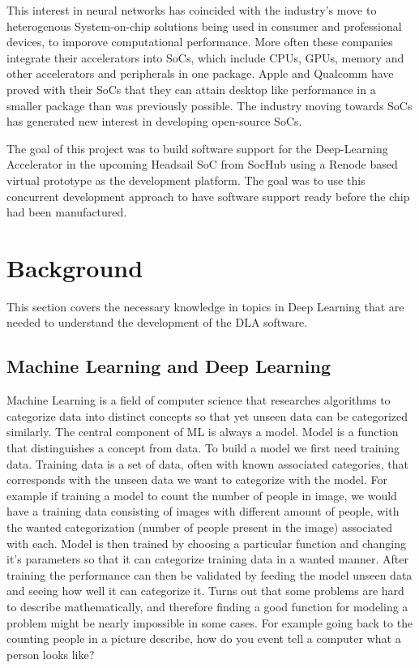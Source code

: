 \documentclass[12pt,a4paper,english
]{tunithesis}
\begin{document}
This interest in neural networks has coincided with the industry's move to heterogenous System-on-chip solutions being used in consumer and professional devices, to imporove computational performance.
More often these companies integrate their accelerators into SoCs, which include CPUs, GPUs, memory and other accelerators and peripherals in one package. Apple and Qualcomm have proved with their SoCs that they can attain desktop like performance in a smaller package than was previously possible. The industry moving towards SoCs has generated new interest in developing open-source SoCs.

The goal of this project was to build software support for the Deep-Learning Accelerator in the upcoming Headsail SoC from SocHub using a Renode based virtual prototype as the development platform. The goal was to use this concurrent development approach to have software support ready before the chip had been manufactured.

\chapter{Background}
This section covers the necessary knowledge in topics in Deep Learning that are needed to understand the development of the DLA software.
\label{ch:background}
\section{Machine Learning and Deep Learning}
Machine Learning is a field of computer science that researches algorithms to categorize data into distinct concepts so that yet unseen data can be categorized similarly. The central component of ML is always a model. Model is a function that distinguishes a concept from data.
To build a model we first need training data. Training data is a set of data, often with known associated categories, that corresponds with the unseen data we want to categorize with the model. For example if training a model to count the number of people in image, we would have a training data consisting of images with different amount of people, with the wanted categorization (number of people present in the image) associated with each.
Model is then trained by choosing a particular function and changing it's parameters so that it can categorize training data in a wanted manner. After training the performance can then be validated by feeding the model unseen data and seeing how well it can categorize it.
Turns out that some problems are hard to describe mathematically, and therefore finding a good function for modeling a problem might be nearly impossible in some cases. For example going back to the counting people in a picture describe, how do you event tell a computer what a person looks like?
\end{document}
